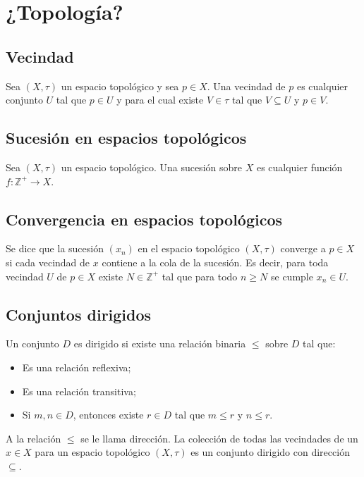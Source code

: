 \documentclass{article}
\begin{document}
\section*{¿Topología?}

\subsection*{Vecindad}

Sea $(X,\tau)$ un espacio topológico y sea $p\in X$. Una vecindad de $p$ es cualquier conjunto $U$ tal que $p\in U$ y para el cual existe $V\in\tau$ tal que $V\subseteq U$ y $p\in V$.

\subsection*{Sucesión en espacios topológicos}

Sea $(X,\tau)$ un espacio topológico. Una sucesión sobre $X$ es cualquier función $f:\mathbb{Z}^+\to X$.

\subsection*{Convergencia en espacios topológicos}

Se dice que la sucesión $(x_n)$ en el espacio topológico $(X,\tau)$ converge a $p\in X$ si cada vecindad de $x$ contiene a la cola de la sucesión. Es decir, para toda vecindad $U$ de $p\in X$ existe $N\in\mathbb{Z}^+$ tal que para todo $n\geq N$ se cumple $x_n\in U$.

\subsection*{Conjuntos dirigidos}

Un conjunto $D$ es dirigido si existe una relación binaria $\leq$ sobre $D$ tal que:
\begin{itemize}
\item Es una relación reflexiva;

\item Es una relación transitiva;

\item Si $m,n\in D$, entonces existe $r\in D$ tal que $m\leq r$ y $n\leq r$.
\end{itemize}
A la relación $\leq$ se le llama dirección. La colección de todas las vecindades de un $x\in X$ para un espacio topológico $(X,\tau)$ es un conjunto dirigido con dirección $\subseteq$.
\end{document}
